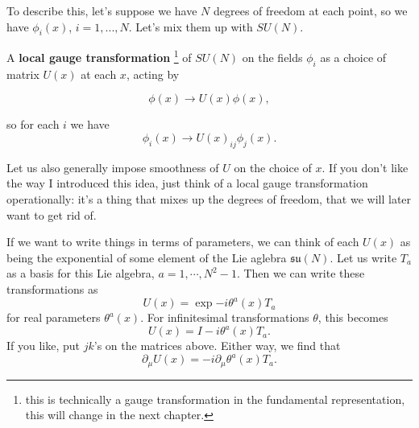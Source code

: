 \documentclass[main.tex]{subfiles}
\begin{document}
To describe this, let's suppose we have $N$ degrees of freedom at each point, so we have $\phi_i (x)$, $i = 1,...,N$. Let's mix them up with $SU(N)$. 

\begin{defn}
A \textbf{local gauge transformation} \footnote{this is technically a gauge transformation in the fundamental representation, this will change in the next chapter.} of $SU(N)$ on the fields $\phi_i$ as a choice of matrix $U(x)$ at each $x$, acting by

\begin{equation} \label{localgaugetrans}
 \boxed{\phi (x) \to U(x) \phi(x),}
\end{equation}

so for each $i$ we have
\[
\phi_i(x) \to U(x)_{ij} \phi_j (x).
\]
\end{defn}
Let us also generally impose smoothness of $U$ on the choice of $x$. If you don't like the way I introduced this idea, just think of a local gauge transformation operationally: it's a thing that mixes up the degrees of freedom, that we will later want to get rid of.

If we want to write things in terms of parameters, we can think of each $U(x)$ as being the exponential of some element of the Lie aglebra $\mathfrak{su} (N)$. Let us write $T_a$ as a basis for this Lie algebra, $a = 1,\cdots, N^2 -1$. Then we can write these transformations as
\[
U(x) = \exp{- i \theta^a (x) T_a}
\]
for real parameters $\theta^a (x)$. For infinitesimal transformations $\theta$, this becomes
\[
U(x) = I - i \theta^a (x) T_a.
\]
If you like, put $jk$'s on the matrices above. Either way, we find that 
\[
\partial_\mu U (x) = -i \partial_\mu \theta^a (x) T_a.
\]
\end{document}
